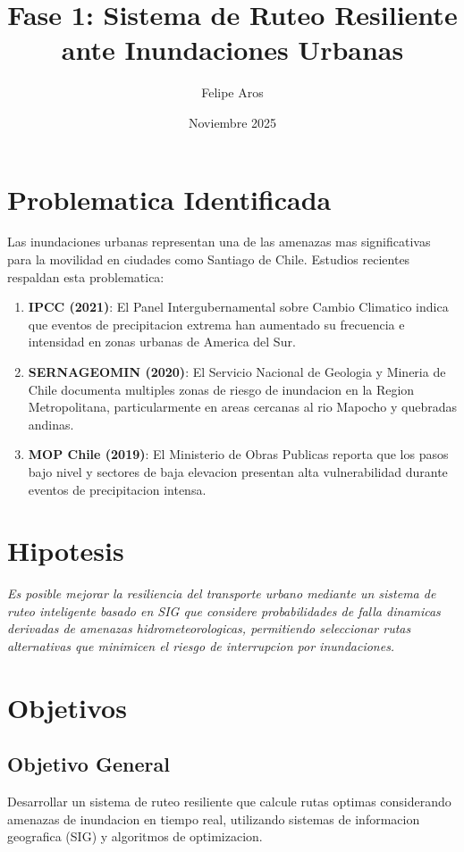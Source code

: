 \documentclass[12pt,a4paper]{article}
\title{Fase 1: Sistema de Ruteo Resiliente ante Inundaciones Urbanas}
\author{Felipe Aros}
\date{Noviembre 2025}
\begin{document}
\maketitle

\section{Problematica Identificada}

Las inundaciones urbanas representan una de las amenazas mas significativas para la movilidad en ciudades como Santiago de Chile. Estudios recientes respaldan esta problematica:

\begin{enumerate}
    \item \textbf{IPCC (2021)}: El Panel Intergubernamental sobre Cambio Climatico indica que eventos de precipitacion extrema han aumentado su frecuencia e intensidad en zonas urbanas de America del Sur.

    \item \textbf{SERNAGEOMIN (2020)}: El Servicio Nacional de Geologia y Mineria de Chile documenta multiples zonas de riesgo de inundacion en la Region Metropolitana, particularmente en areas cercanas al rio Mapocho y quebradas andinas.

    \item \textbf{MOP Chile (2019)}: El Ministerio de Obras Publicas reporta que los pasos bajo nivel y sectores de baja elevacion presentan alta vulnerabilidad durante eventos de precipitacion intensa.
\end{enumerate}

\section{Hipotesis}

\textit{Es posible mejorar la resiliencia del transporte urbano mediante un sistema de ruteo inteligente basado en SIG que considere probabilidades de falla dinamicas derivadas de amenazas hidrometeorologicas, permitiendo seleccionar rutas alternativas que minimicen el riesgo de interrupcion por inundaciones.}

\section{Objetivos}

\subsection{Objetivo General}
Desarrollar un sistema de ruteo resiliente que calcule rutas optimas considerando amenazas de inundacion en tiempo real, utilizando sistemas de informacion geografica (SIG) y algoritmos de optimizacion.
\end{document}
